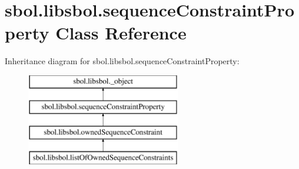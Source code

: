 \hypertarget{classsbol_1_1libsbol_1_1sequence_constraint_property}{}\section{sbol.\+libsbol.\+sequence\+Constraint\+Property Class Reference}
\label{classsbol_1_1libsbol_1_1sequence_constraint_property}
Inheritance diagram for sbol.\+libsbol.\+sequence\+Constraint\+Property\+:\begin{figure}[H]
\begin{center}
\leavevmode
\includegraphics[height=4.000000cm]{classsbol_1_1libsbol_1_1sequence_constraint_property}
\end{center}
\end{figure}
